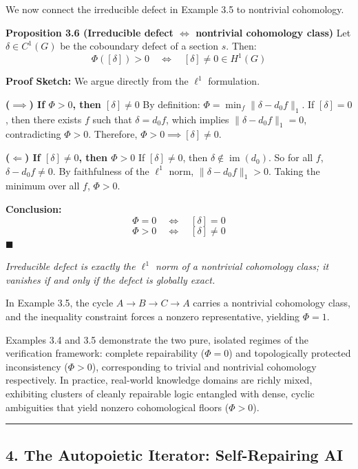 \documentclass[
]{article}
\begin{document}
We now connect the irreducible defect in Example 3.5 to nontrivial
cohomology.

\textbf{Proposition 3.6 (Irreducible defect \(\iff\) nontrivial
cohomology class)} Let \(\delta \in C^1(G)\) be the coboundary defect of
a section \(s\). Then:
\[ \Phi([\delta]) > 0 \quad \Longleftrightarrow \quad [\delta] \neq 0 \in H^1(G) \]

\textbf{Proof Sketch:} We argue directly from the \(\ell^1\)
formulation.

\textbf{(\(\implies\)) If \(\Phi > 0\), then \([\delta] \neq 0\)} By
definition: \(\Phi = \min_{f} \|\delta - d_0 f\|_1\). If
\([\delta] = 0\), then there exists \(f\) such that \(\delta = d_0 f\),
which implies \(\|\delta - d_0 f\|_1 = 0\), contradicting \(\Phi > 0\).
Therefore, \(\Phi > 0 \implies [\delta] \neq 0\).

\textbf{(\(\Longleftarrow\)) If \([\delta] \neq 0\), then \(\Phi > 0\)}
If \([\delta] \neq 0\), then \(\delta \notin \operatorname{im}(d_0)\).
So for all \(f\), \(\delta - d_0 f \neq 0\). By faithfulness of the
\(\ell^1\) norm, \(\|\delta - d_0 f\|_1 > 0\). Taking the minimum over
all \(f\), \(\Phi > 0\).

\textbf{Conclusion:}
\[ \Phi = 0 \quad \Longleftrightarrow \quad [\delta] = 0 \]
\[ \Phi > 0 \quad \Longleftrightarrow \quad [\delta] \neq 0 \]
\(\blacksquare\)

\emph{Irreducible defect is exactly the \(\ell^1\) norm of a nontrivial
cohomology class; it vanishes if and only if the defect is globally
exact.}

In Example 3.5, the cycle \(A \to B \to C \to A\) carries a nontrivial
cohomology class, and the inequality constraint forces a nonzero
representative, yielding \(\Phi = 1\).

Examples 3.4 and 3.5 demonstrate the two pure, isolated regimes of the
verification framework: complete repairability (\(\Phi = 0\)) and
topologically protected inconsistency (\(\Phi > 0\)), corresponding to
trivial and nontrivial cohomology respectively. In practice, real-world
knowledge domains are richly mixed, exhibiting clusters of cleanly
repairable logic entangled with dense, cyclic ambiguities that yield
nonzero cohomological floors (\(\Phi > 0\)).

\begin{center}\rule{0.5\linewidth}{0.5pt}\end{center}

\subsection{4. The Autopoietic Iterator: Self-Repairing
AI}\label{the-autopoietic-iterator-self-repairing-ai}
\end{document}
